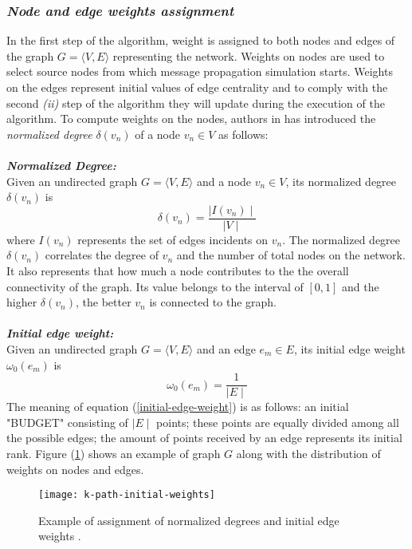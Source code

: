 {\subsubsection*{\textit{Node and edge weights assignment}}
In the first step of the algorithm, weight is assigned to both nodes and edges of the graph $G = \langle V, E \rangle$ representing the network. Weights on nodes are used to select source nodes from which message propagation simulation starts. Weights on the edges represent initial values of edge centrality and to comply with the second \textit{(ii)} step of the algorithm they will update during the execution of the algorithm. To compute weights on the nodes, authors in  \cite{ref-35} has introduced the \textit{normalized degree} $\delta(v_n)$ of a node $v_n \in V$ as follows:\\\\
\textbf{\textit{Normalized Degree:}}\\
Given an undirected graph $G = \langle V, E \rangle$ and a node $v_n \in V$, its normalized degree $\delta(v_n)$ is
\begin{equation}\label{k-path-normalized-degree}
\delta (v_n) = \dfrac{\mid I(v_n) \mid}{\mid V \mid}
\end{equation}
where $I(v_n)$ represents the set of edges incidents on $v_n$. The normalized degree $\delta(v_n)$ correlates the degree of $v_n$ and the number of total nodes on the network. It also represents that how much a node contributes to the the overall connectivity of the graph. Its value belongs to the interval of $\left[0,1\right]$ and the higher $\delta (v_n)$, the better $v_n$ is connected to the graph.\\\\
\textbf{\textit{Initial edge weight:}}\\
Given an undirected graph $G = \langle V, E \rangle$ and an edge $e_m \in E$, its initial edge weight $\omega_0 (e_m)$ is
\begin{equation}\label{initial-edge-weight}
\omega_0(e_m) = \dfrac{1}{\mid E \mid}
\end{equation}
The meaning of equation (\ref{initial-edge-weight}) is as follows: an initial "BUDGET" consisting of $\mid E \mid$ points; these points are equally divided among all the possible edges; the amount of points received by an edge represents its initial rank. Figure (\ref{fig:initial-edge-weight-graph}) shows an example of graph $G$ along with the distribution of weights on nodes and edges.
\begin{figure}[!ht]
	\centering
	\texttt{[image: k-path-initial-weights]}
	\caption{Example of assignment of normalized degrees and initial edge weights \cite{ref-35}.}
	\label{fig:initial-edge-weight-graph}
\end{figure}

}
